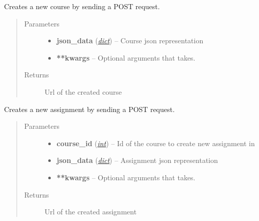 \documentclass[letterpaper,10pt,english]{sphinxmanual}
\begin{document}

\begin{fulllineitems}
\label{web_portal:core.courses.api.create_course}
Creates a new course by sending a POST request.
\begin{quote}\begin{description}
\item[{Parameters}] \leavevmode\begin{itemize}
\item {} 
\textbf{json\_data} (\href{http://docs.python.org/library/stdtypes.html\#dict}{\emph{dict}}) -- Course json representation

\item {} 
\textbf{**kwargs} -- Optional arguments that  takes.

\end{itemize}

\item[{Returns}] \leavevmode
Url of the created course

\end{description}\end{quote}

\end{fulllineitems}


\begin{fulllineitems}
\label{web_portal:core.courses.api.create_assignment}
Creates a new assignment by sending a POST request.
\begin{quote}\begin{description}
\item[{Parameters}] \leavevmode\begin{itemize}
\item {} 
\textbf{course\_id} (\href{http://docs.python.org/library/functions.html\#int}{\emph{int}}) -- Id of the course to create new assignment in

\item {} 
\textbf{json\_data} (\href{http://docs.python.org/library/stdtypes.html\#dict}{\emph{dict}}) -- Assignment json representation

\item {} 
\textbf{**kwargs} -- Optional arguments that  takes.

\end{itemize}

\item[{Returns}] \leavevmode
Url of the created assignment

\end{description}\end{quote}

\end{fulllineitems}
\end{document}
